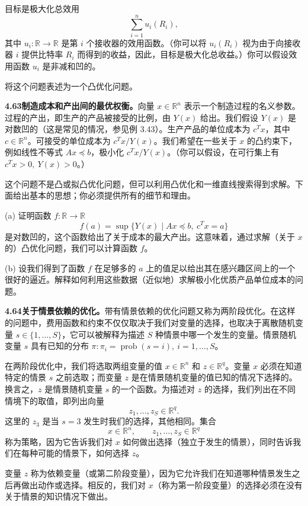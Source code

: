 \documentclass[UTF8,12pt,a4paper,fontset=fandol]{ctexart}
\begin{document}
目标是极大化总效用
\[
\sum_{i=1}^n u_i(R_i),
\]
其中 $u_i:\mathbb{R}\to\mathbb{R}$ 是第 $i$ 个接收器的效用函数。（你可以将 $u_i(R_i)$ 视为由于向接收器 $i$ 提供比特率 $R_i$ 而得到的收益，因此，目标是极大化总收益。）你可以假设效用函数 $u_i$ 是非减和凹的。

将这个问题表述为一个凸优化问题。

\noindent\textbf{4.63\quad 制造成本和产出间的最优权衡。}\quad 向量 $x\in\mathbb{R}^n$ 表示一个制造过程的名义参数。过程的产出，即生产的产品被接受的比例，由 $Y(x)$ 给出。我们假设 $Y(x)$ 是对数凹的（这是常见的情况，参见例 3.43）。生产产品的单位成本为 $c^Tx$，其中 $c\in\mathbb{R}^n$。可接受的单位成本为 $c^Tx/Y(x)$。我们希望在一些关于 $x$ 的凸约束下，例如线性不等式 $Ax\preceq b$，极小化 $c^Tx/Y(x)$。（你可以假设，在可行集上有 $c^Tx>0,\ Y(x)>0$。）

这个问题不是凸或拟凸优化问题，但可以利用凸优化和一维直线搜索得到求解。下面给出基本的思想；你必须提供所有的细节和理由。

(a) 证明函数 $f:\mathbb{R}\to\mathbb{R}$
\[
f(a)=\sup\{Y(x)\mid Ax\preceq b,\ c^Tx=a\}
\]
是对数凹的，这个函数给出了关于成本的最大产出。这意味着，通过求解（关于 $x$ 的）凸优化问题，我们可以计算函数 $f$。

(b) 设我们得到了函数 $f$ 在足够多的 $a$ 上的值足以给出其在感兴趣区间上的一个很好的逼近。解释如何利用这些数据（近似地）求解极小化优质产品单位成本的问题。

\noindent\textbf{4.64\quad 关于情景依赖的优化。}\quad 带有情景依赖的优化问题又称为两阶段优化。在这样的问题中，费用函数和约束不仅仅取决于我们对变量的选择，也取决于离散随机变量 $s\in\{1,\ldots,S\}$，它可以被解释为描述 $S$ 种情景中哪一个发生的变量。情景随机变量 $s$ 具有已知的分布 $\pi:\pi_i=\operatorname{prob}(s=i),\ i=1,\ldots,S$。

在两阶段优化中，我们将选取两组变量的值 $x\in\mathbb{R}^n$ 和 $z\in\mathbb{R}^q$。变量 $x$ 必须在知道特定的情景 $s$ 之前选取；而变量 $z$ 是在情景随机变量的值已知的情况下选择的。换言之，$z$ 是情景随机变量 $s$ 的一个函数。为描述对 $z$ 的选择，我们列出在不同情境下的取值，即列出向量
\[
z_1,\ldots,z_S\in\mathbb{R}^q.
\]
这里的 $z_3$ 是当 $s=3$ 发生时我们的选择，其他相同。集合
\[
x\in\mathbb{R}^n,\qquad z_1,\ldots,z_S\in\mathbb{R}^q
\]
称为策略，因为它告诉我们对 $x$ 如何做出选择（独立于发生的情景），同时告诉我们在每种可能的情景下，如何选择 $z$。

变量 $z$ 称为依赖变量（或第二阶段变量），因为它允许我们在知道哪种情景发生之后再做出动作或选择。相反的，我们对 $x$（称为第一阶段变量）的选择必须在没有关于情景的知识情况下做出。
\end{document}
